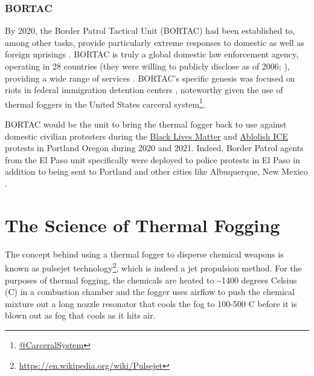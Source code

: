 \documentclass[
  11pt,
]{krantz}
\renewcommand{\href}[2]{#2\footnote{\url{#1}}}
\begin{document}
\hypertarget{bortac}{%
\subsection*{BORTAC}\label{bortac}}


By 2020, the Border Patrol Tactical Unit (BORTAC) had been established to, among other tasks, provide particularly extreme responses to domestic as well as foreign uprisings \citep{CBP2006, CBP2014, CBP2018}.
BORTAC is truly a global domestic law enforcement agency, operating in 28 countries (they were willing to publicly disclose as of 2006; \citet{CBP2006}), providing a wide range of services \citep{CBP2014, Miller2019}.
BORTAC's specific genesis was focused on riots in federal immigration detention centers \citep{CBP2006, CBP2014}, noteworthy given the use of thermal foggers in the United States \href{@CarceralSystem}{carceral system}.

BORTAC would be the unit to bring the thermal fogger back to use against domestic civilian protesters during the \protect\hyperlink{PortlandOR2020_07_29}{Black Lives Matter} and \protect\hyperlink{PortlandORICE2020_2021}{Ablolish ICE} protests in Portland Oregon during 2020 and 2021.
Indeed, Border Patrol agents from the El Paso unit specifically were deployed to police protests in El Paso in addition to being sent to Portland and other cities like Albuquerque, New Mexico \citep{Borunda2020}.

\hypertarget{Science}{%
\chapter*{The Science of Thermal Fogging}\label{Science}}


The concept behind using a thermal fogger to disperse chemical weapons is known as \href{https://en.wikipedia.org/wiki/Pulsejet}{pulsejet technology}, which is indeed a jet propulsion method.
For the purposes of thermal fogging, the chemicals are heated to \textasciitilde1400 degrees Celsius (C) in a combustion chamber and the fogger uses airflow to push the chemical mixture out a long nozzle resonator that cools the fog to 100-500 C before it is blown out as fog that cools as it hits air.
\end{document}
